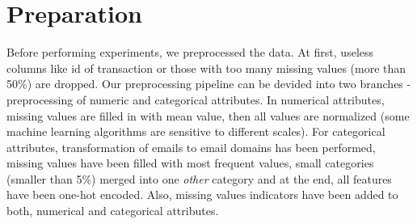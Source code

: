 \documentclass[runningheads]{llncs}
\begin{document}







\section{Preparation}

Before performing experiments, we preprocessed the data. At first, useless columns like id of transaction or those with too many missing values (more than 50\%) are dropped. Our preprocessing pipeline can be devided into two branches - preprocessing of numeric and categorical attributes. In numerical attributes, missing values are filled in with mean value, then all values are normalized (some machine learning algorithms are sensitive to different scales). For categorical attributes, transformation of emails to email domains has been performed, missing values have been filled with most frequent values, small categories (smaller than 5\%) merged into one \textit{other} category and at the end, all features have been one-hot encoded. Also, missing values indicators have been added to both, numerical and categorical attributes.


\end{document}
